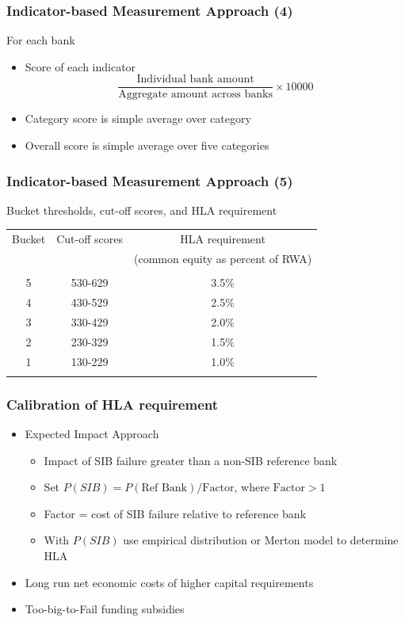 \documentclass[aspectratio=43,dvipsnames,usenames, svgnames]{beamer}
\begin{document}
\begin{frame} %
\frametitle{Indicator-based Measurement Approach (4)}
For each bank
	\begin{itemize}
		\item Score of each indicator
		\[ \frac{\text{Individual bank amount}}{\text{Aggregate amount across banks}} \times 10000\] 
		\smallskip
		\item Category score is simple average over category
		\smallskip
		\item Overall score is simple average over five categories
	\end{itemize}

\end{frame}

\begin{frame} %
\frametitle{Indicator-based Measurement Approach (5)}
\begin{center}
Bucket thresholds, cut-off scores, and HLA requirement
\medskip
\vspace{1em}
	\begin{tabular}{ccc} 
	\hline \hline
	Bucket & Cut-off scores & HLA requirement \\
	& & \footnotesize{(common equity as percent of RWA)} \\
	\hline
	\\
	\rowcolor{Gray!20}5 & 530-629 & 3.5\% \\
	4 & 430-529 & 2.5\% \\
	\rowcolor{Gray!20}3 & 330-429 & 2.0\% \\
	2 & 230-329 & 1.5\% \\
	\rowcolor{Gray!20}1 & 130-229 & 1.0\% \\
	\\
	\hline
	\end{tabular}
\end{center}
\end{frame}

\begin{frame} %
\frametitle{Calibration of HLA requirement}
	\begin{itemize}
		\item Expected Impact Approach
		\begin{itemize}
			\item Impact of SIB failure greater than a non-SIB reference bank
			\smallskip
			\item Set $P(SIB) = P(\text{Ref Bank})/\text{Factor}$, where $\text{Factor}>1$
			\smallskip
			\item Factor = cost of SIB failure relative to reference bank
			\smallskip
			\item With $P(SIB)$ use empirical distribution or Merton model to determine HLA 
		\end{itemize}
		\smallskip
		\item Long run net economic costs of higher capital requirements
		\smallskip
		\item Too-big-to-Fail funding subsidies 
	\end{itemize}
\end{frame}
\end{document}
